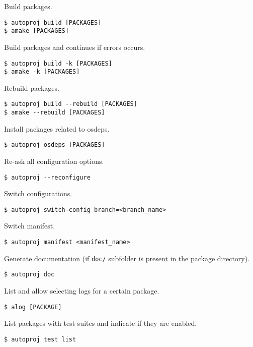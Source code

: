 \documentclass[9pt]{innovativeinnovation-cheatsheet}
\begin{document}
\begin{multicols*}{3}
Build packages.
\begin{lstlisting}
$ autoproj build [PACKAGES]
$ amake [PACKAGES]
\end{lstlisting}

Build packages and continues if errors occurs.
\begin{lstlisting}
$ autoproj build -k [PACKAGES]
$ amake -k [PACKAGES]
\end{lstlisting}

Rebuild packages.
\begin{lstlisting}
$ autoproj build --rebuild [PACKAGES]
$ amake --rebuild [PACKAGES]
\end{lstlisting}

Install packages related to osdeps.
\begin{lstlisting}
$ autoproj osdeps [PACKAGES]
\end{lstlisting}


Re-ask all configuration options.
\begin{lstlisting}
$ autoproj --reconfigure
\end{lstlisting}

Switch configurations.
\begin{lstlisting}
$ autoproj switch-config branch=<branch_name>
\end{lstlisting}

Switch manifest.
\begin{lstlisting}
$ autoproj manifest <manifest_name>
\end{lstlisting}


Generate documentation (if \verb|doc/| subfolder is present in the package directory).
\begin{lstlisting}
$ autoproj doc
\end{lstlisting}


List and allow selecting logs for a certain package.
\begin{lstlisting}
$ alog [PACKAGE]
\end{lstlisting}


List packages with test suites and indicate if they are enabled.
\begin{lstlisting}
$ autoproj test list
\end{lstlisting}


\end{multicols*}
\end{document}
